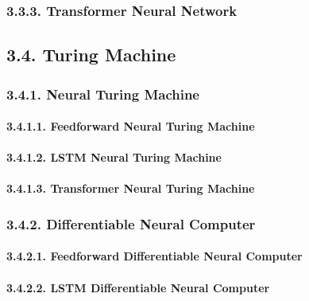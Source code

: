 \documentclass[]{article}
\let\oldparagraph\paragraph
\renewcommand{\paragraph}[1]{\oldparagraph{#1}\mbox{}}
\begin{document}
\subsubsection{3.3.3. Transformer Neural
Network}\label{transformer-neural-network}

\subsection{3.4. Turing Machine}\label{turing-machine}

\subsubsection{3.4.1. Neural Turing
Machine}\label{neural-turing-machine}

\paragraph{3.4.1.1. Feedforward Neural Turing
Machine}\label{feedforward-neural-turing-machine}

\paragraph{3.4.1.2. LSTM Neural Turing
Machine}\label{lstm-neural-turing-machine}

\paragraph{3.4.1.3. Transformer Neural Turing
Machine}\label{transformer-neural-turing-machine}

\subsubsection{3.4.2. Differentiable Neural
Computer}\label{differentiable-neural-computer}

\paragraph{3.4.2.1. Feedforward Differentiable Neural
Computer}\label{feedforward-differentiable-neural-computer}

\paragraph{3.4.2.2. LSTM Differentiable Neural
Computer}\label{lstm-differentiable-neural-computer}
\end{document}
